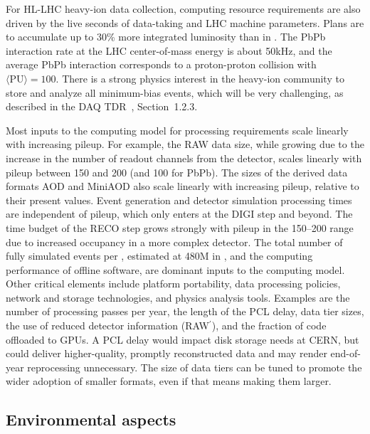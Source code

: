 For \gls{HL-LHC} heavy-ion data collection, computing resource requirements are also driven by the live seconds of data-taking and LHC machine parameters. Plans are to accumulate up to 30\% more integrated luminosity than in \RunThree. The PbPb interaction rate at the LHC center-of-mass energy is about 50\unit{kHz}, and the average PbPb interaction corresponds to a proton-proton collision with $\langle\text{PU}\rangle = 100$. There is a strong physics interest in the heavy-ion community to store and analyze all minimum-bias events, which will be very challenging, as described in the \gls{DAQ} \gls{TDR}~\cite{CMS:2021DAQTDR}, Section~1.2.3.

Most inputs to the computing model for processing requirements scale linearly with increasing pileup. For example, the \gls{RAW} data size, while growing due to the increase in the number of readout channels from the \PhaseTwo detector, scales linearly with pileup between 150 and 200 (and 100 for PbPb). The sizes of the derived data formats \gls{AOD} and MiniAOD also scale linearly with increasing pileup, relative to their present values. Event generation and detector simulation processing times are independent of pileup, which only enters at the \gls{DIGI} step and beyond. The time budget of the \gls{RECO} step grows strongly with pileup in the 150--200 range due to increased occupancy in a more complex \PhaseTwo detector.
The total number of fully simulated events per \fbinv, estimated at 480\unit{M} in \RunFour, and the computing performance of offline software, are dominant inputs to the \PhaseTwo computing model. Other critical elements include 
platform portability, data processing policies, network and storage technologies, and physics analysis tools. Examples are the number of processing passes per year, the length of the \gls{PCL} delay, data tier sizes, the use of reduced detector information (\gls{RAW}$^\prime$), and the fraction of code offloaded to \glspl{GPU}. A \gls{PCL} delay would impact disk storage needs at CERN, but could deliver higher-quality, promptly reconstructed data and may render end-of-year reprocessing unnecessary. The size of data tiers can be tuned to promote the wider adoption of smaller formats, even if that means making them larger.

\subsection{Environmental aspects}

